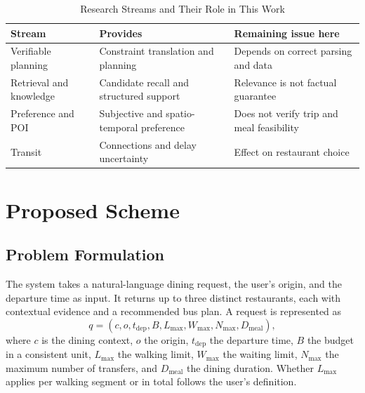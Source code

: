 \documentclass[conference]{IEEEtran}
\begin{document}
\begin{table}[t]
\caption{Research Streams and Their Role in This Work}
\label{tab:related}
\centering
\footnotesize
\begin{tabularx}{\columnwidth}{@{}>{\raggedright\arraybackslash}p{}LL@{}}
\toprule
Stream & Provides & Remaining issue here \\
\midrule
Verifiable planning \cite{llm_planning,llm_planning_tools,ttg,hypertree_planning} & Constraint translation and planning & Depends on correct parsing and data \\
Retrieval and knowledge \cite{bright,hybrid_retrieval,knowledge_graph_llm_recommendation} & Candidate recall and structured support & Relevance is not factual guarantee \\
Preference and POI \cite{subjective_attributes,critique_preference,restaurant_habib,poi_stisan} & Subjective and spatio-temporal preference & Does not verify trip and meal feasibility \\
Transit \cite{bus_dynamic_replanning,bus_delay_uncertainty} & Connections and delay uncertainty & Effect on restaurant choice \\
\bottomrule
\end{tabularx}
\end{table}

\section{Proposed Scheme}\label{sec:method}
\subsection{Problem Formulation}
The system takes a natural-language dining request, the user's origin, and the departure time as input. It returns up to three distinct restaurants, each with contextual evidence and a recommended bus plan. A request is represented as
\begin{equation}
q=(c, o, t_{\mathrm{dep}}, B, L_{\max}, W_{\max}, N_{\max}, D_{\mathrm{meal}}),
\label{eq:request}
\end{equation}
where $c$ is the dining context, $o$ the origin, $t_{\mathrm{dep}}$ the departure time, $B$ the budget in a consistent unit, $L_{\max}$ the walking limit, $W_{\max}$ the waiting limit, $N_{\max}$ the maximum number of transfers, and $D_{\mathrm{meal}}$ the dining duration. Whether $L_{\max}$ applies per walking segment or in total follows the user's definition.
\end{document}
